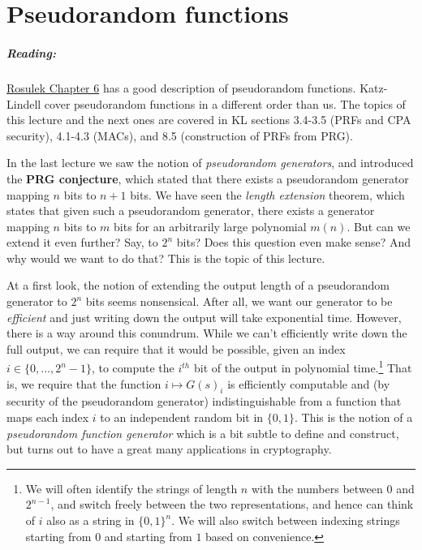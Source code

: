 \chapter{Pseudorandom functions}\label{4-Pseudorandom-functions}

\paragraph{Reading:}
\href{https://web.engr.oregonstate.edu/~rosulekm/crypto/chap6.pdf}{Rosulek
Chapter 6} has a good description of pseudorandom functions.
Katz-Lindell cover pseudorandom functions in a different order than us.
The topics of this lecture and the next ones are covered in KL sections
3.4-3.5 (PRFs and CPA security), 4.1-4.3 (MACs), and 8.5 (construction
of PRFs from PRG).

In the last lecture we saw the notion of \emph{pseudorandom generators},
and introduced the \textbf{PRG conjecture}, which stated that there
exists a pseudorandom generator mapping \(n\) bits to \(n+1\) bits. We
have seen the \emph{length extension} theorem, which states that given
such a pseudorandom generator, there exists a generator mapping \(n\)
bits to \(m\) bits for an arbitrarily large polynomial \(m(n)\). But can
we extend it even further? Say, to \(2^n\) bits? Does this question even
make sense? And why would we want to do that? This is the topic of this
lecture.

At a first look, the notion of extending the output length of a
pseudorandom generator to \(2^n\) bits seems nonsensical. After all, we
want our generator to be \emph{efficient} and just writing down the
output will take exponential time. However, there is a way around this
conundrum. While we can't efficiently write down the full output, we can
require that it would be possible, given an index
\(i\in \{0,\ldots,2^n-1\}\), to compute the \(i^{th}\) bit of the output
in polynomial time.\footnote{We will often identify the strings of
  length \(n\) with the numbers between \(0\) and \(2^{n-1}\), and
  switch freely between the two representations, and hence can think of
  \(i\) also as a string in \(\{0,1\}^n\). We will also switch between
  indexing strings starting from \(0\) and starting from \(1\) based on
  convenience.} That is, we require that the function
\(i \mapsto G(s)_i\) is efficiently computable and (by security of the
pseudorandom generator) indistinguishable from a function that maps each
index \(i\) to an independent random bit in \(\{0,1\}\). This is the
notion of a \emph{pseudorandom function generator} which is a bit subtle
to define and construct, but turns out to have a great many applications
in cryptography.

